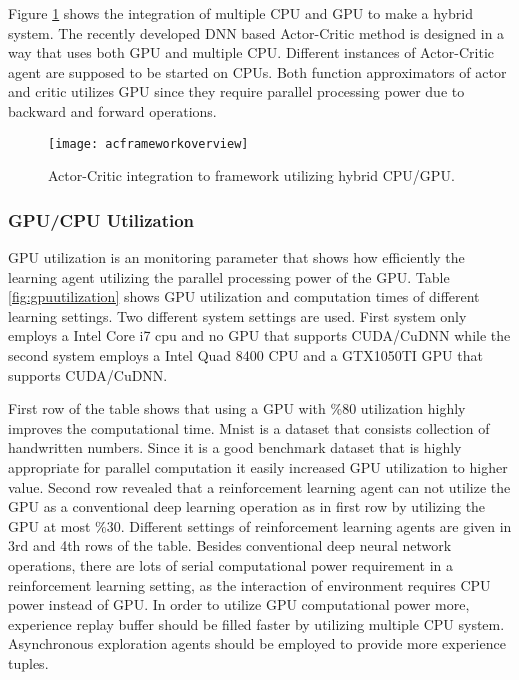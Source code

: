 \documentclass{ituphdreport}
\begin{document}
Figure \ref{fig:acframeworkoverview} shows the integration of multiple CPU and GPU to make a hybrid system. The recently developed DNN based Actor-Critic method is designed in a way that uses both GPU and multiple CPU. Different instances of Actor-Critic agent are supposed to be started on CPUs. Both function approximators of actor and critic utilizes GPU since they require parallel processing power due to backward and forward operations.

\begin{figure}[h]
	\begin{center}
		\texttt{[image: acframeworkoverview]}
	\end{center}
	\caption{Actor-Critic integration to framework utilizing hybrid CPU/GPU.
		\label{fig:acframeworkoverview}}
\end{figure}


\subsubsection{GPU/CPU Utilization} \label{sec:gputilizaiton}
GPU utilization is an monitoring parameter that shows how efficiently the learning agent utilizing the parallel processing power of the GPU. Table \ref{fig:gpuutilization} shows GPU utilization and computation times of different learning settings. Two different system settings are used. First system only employs a Intel Core i7 cpu and no GPU that supports CUDA/CuDNN while the second system employs a Intel Quad 8400 CPU and a GTX1050TI GPU that supports CUDA/CuDNN. 

First row of the table shows that using a GPU with \%80 utilization highly improves the computational time. Mnist is a dataset that consists collection of handwritten numbers. Since it is a good benchmark dataset that is highly appropriate for parallel computation it easily increased GPU utilization to higher value. Second row revealed that a reinforcement learning agent can not utilize the GPU as a conventional deep learning operation as in first row by utilizing the GPU at most \%30. Different settings of reinforcement learning agents are given in 3rd and 4th rows of the table. Besides conventional deep neural network operations, there are lots of serial computational power requirement in a reinforcement learning setting, as the interaction of environment requires CPU power instead of GPU. In order to utilize GPU computational power more, experience replay buffer should be filled faster by utilizing multiple CPU system. Asynchronous exploration agents should be employed to provide more experience tuples. 
\end{document}
